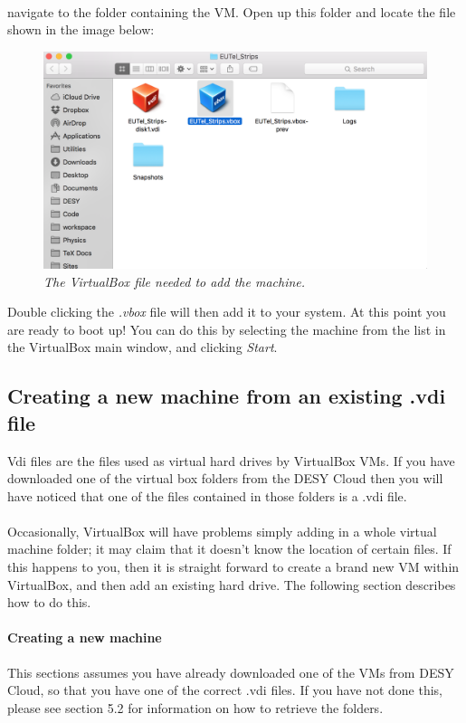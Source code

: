 \documentclass[11pt]{article}
\begin{document}
\paragraph{}
navigate to the folder containing the VM. Open up this folder and locate the file shown in the image below:
\begin{figure}[!ht]
	\centering
	\includegraphics[scale=0.3]{images/vbfile.png}
	\caption{\textit{The VirtualBox file needed to add the machine.}}
\end{figure}
Double clicking the \textit{.vbox} file will then add it to your system. At this point you are ready to boot up! You can do this by selecting the machine from the list in the VirtualBox main window, and clicking \textit{Start}.
\subsection{Creating a new machine from an existing .vdi file}
Vdi files are the files used as virtual hard drives by VirtualBox VMs. If you have downloaded one of the virtual box folders from the DESY Cloud then you will have noticed that one of the files contained in those folders is a .vdi file.
\paragraph{}
Occasionally, VirtualBox will have problems simply adding in a whole virtual machine folder; it may claim that it doesn't know the location of certain files. If this happens to you, then it is straight forward to create a brand new VM within VirtualBox, and then add an existing hard drive. The following section describes how to do this.
\paragraph{Creating a new machine}
This sections assumes you have already downloaded one of the VMs from DESY Cloud, so that you have one of the correct .vdi files. If you have not done this, please see section 5.2 for information on how to retrieve the folders.
\end{document}
